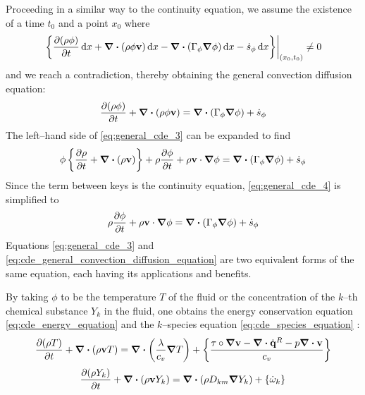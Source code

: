 Proceeding in a similar way to the continuity equation, we assume the existence
of a time $t_0$ and a point $x_0$ where
\begin{equation*}
	\left.
	\left\{
	\pdv{(\rho \phi)}{t} \dd{x} + 
	\div(\rho \phi \vb{v}) \dd{x} - 
	\div(\Gamma_\phi \grad{\phi}) \dd{x} - 
	\dot{s}_\phi \dd{x}	
	\right\}
	\right\rvert_{(x_0,t_0)} \neq 0
\end{equation*}
and we reach a contradiction, thereby obtaining the general convection diffusion
equation:
\begin{equation} \label{eq:general_cde_3}
	\pdv{(\rho \phi)}{t} + \div(\rho \phi \vb{v}) = 
	\div(\Gamma_\phi \grad{\phi}) + \dot{s}_\phi	
\end{equation}
The left--hand side of \eqref{eq:general_cde_3} can be expanded to find
\begin{equation} \label{eq:general_cde_4}
	\phi \left\{ \pdv{\rho}{t} + \div(\rho \vb{v}) \right\} + 
	\rho \pdv{\phi}{t} + \rho \vb{v} \cdot \grad{\phi} = 
	\div(\Gamma_\phi \grad{\phi}) + \dot{s}_\phi	
\end{equation}
Since the term between keys is the continuity equation, \eqref{eq:general_cde_4}
is simplified to
\begin{equation} \label{eq:cde_general_convection_diffusion_equation}
	\rho \pdv{\phi}{t} + \rho \vb{v} \cdot \grad{\phi} = 
	\div(\Gamma_\phi \grad{\phi}) + \dot{s}_\phi	
\end{equation}
Equations \eqref{eq:general_cde_3} and
\eqref{eq:cde_general_convection_diffusion_equation} are two equivalent forms of
the same equation, each having its applications and benefits.

By taking $\phi$ to be the temperature $T$ of the fluid or the concentration of
the $k$--th chemical substance $Y_k$ in the fluid, one obtains the energy
conservation equation \eqref{eq:cde_energy_equation} and the $k$--species
equation \eqref{eq:cde_species_equation} \cite{cttc_cde_2021}:
\begin{equation} \label{eq:cde_energy_equation}
	\pdv{(\rho T)}{t} + \div(\rho \vb{v} T) = 
	\div(\frac{\lambda}{c_v} \grad{T}) + 
	\left\{ \frac{\vb{\tau} \circ \grad{\vb{v}} - \div{\dot{\vb{q}}^R} - p \div{\vb{v}}}{c_v}\right\}
\end{equation}
\begin{equation} \label{eq:cde_species_equation}
	\pdv{(\rho Y_k)}{t} + \div(\rho \vb{v} Y_k) = 
	\div(\rho D_{km} \grad{Y_k}) + \left\{ \dot{\omega}_k \right\}
\end{equation}

